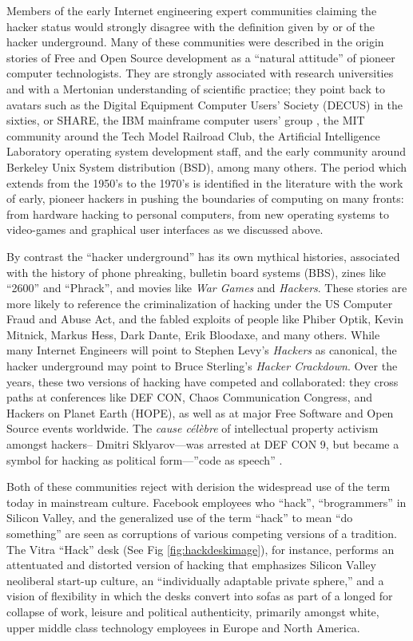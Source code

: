 \documentclass[10pt,letter,oneside]{scrartcl}
\begin{document}
Members of the early Internet engineering expert communities claiming the hacker
status would strongly disagree with the definition given by or of the hacker
underground. Many of these communities were described in the origin stories of
Free and Open Source development as a ``natural attitude'' of pioneer computer
technologists.  They are strongly associated with research universities and with
a Mertonian understanding of scientific practice; they point back to avatars 
such as the Digital Equipment Computer Users' Society (DECUS) in the sixties, or 
SHARE, the IBM mainframe computer users' group \parencite{akera2001voluntarism}, 
the MIT community around the Tech Model Railroad Club, the Artificial Intelligence Laboratory operating system development staff, and the early community around 
Berkeley Unix System distribution (BSD), among many others.  The period which 
extends from the 1950's to the 1970's is identified in the literature with the 
work of early, pioneer hackers in pushing the boundaries of computing on many 
fronts: from hardware hacking to personal computers, from new operating systems 
to video-games and graphical user interfaces as we discussed above.

By contrast the ``hacker underground'' has its own mythical histories,
associated with the history of phone phreaking, bulletin board systems (BBS),
zines like ``2600'' and ``Phrack'', and movies like \emph{War Games} and
\emph{Hackers}.  These stories are more likely to reference the criminalization
of hacking under the US Computer Fraud and Abuse Act, and the fabled exploits
of people like Phiber Optik, Kevin Mitnick, Markus Hess, Dark Dante, Erik 
Bloodaxe, and many others.  While many Internet Engineers will point to 
Stephen Levy's \emph{Hackers} as canonical, the hacker underground may point to 
Bruce Sterling's \emph{Hacker Crackdown}.  Over the years, these two versions of
hacking have competed and collaborated: they cross paths at conferences like
DEF CON, Chaos Communication Congress, and Hackers on Planet Earth (HOPE), as 
well as at major Free Software and Open Source events worldwide.  The 
\emph{cause célèbre} of intellectual property activism amongst hackers--
Dmitri Sklyarov---was arrested at DEF CON 9, but became a symbol for 
hacking as political form---''code as speech'' \parencite{coleman_code_2009}. 

Both of these communities reject with derision the widespread use of the term
today in mainstream culture.  Facebook employees who ``hack'', ``brogrammers''
in Silicon Valley, and the generalized use of the term ``hack'' to mean ``do
something'' are seen as corruptions of various competing versions of a
tradition.  The Vitra ``Hack'' desk (See Fig \ref{fig:hackdeskimage}), for 
instance, performs an attentuated and distorted version of hacking that 
emphasizes Silicon Valley neoliberal start-up culture, an ``individually 
adaptable private sphere,'' and a vision of flexibility in which the 
desks convert into sofas as part of a longed for collapse of work, 
leisure and political authenticity, primarily amongst white, upper 
middle class technology employees in Europe and North America. 
\end{document}
